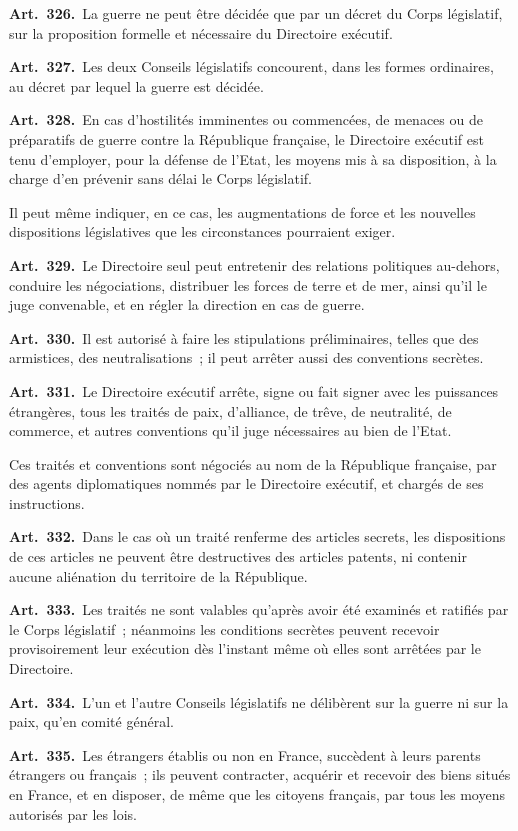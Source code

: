 \documentclass[french,twoside]{book} %
\newcommand{\labelchar}[1]{\textbf{\color{rubric} #1}}
\begin{document}
\labelchar{Art. 326.} La guerre ne peut être décidée que par un décret du Corps législatif, sur la proposition formelle et nécessaire du Directoire exécutif.\par
\labelchar{Art. 327.} Les deux Conseils législatifs concourent, dans les formes ordinaires, au décret par lequel la guerre est décidée.\par
\labelchar{Art. 328.} En cas d’hostilités imminentes ou commencées, de menaces ou de préparatifs de guerre contre la République française, le Directoire exécutif est tenu d’employer, pour la défense de l’Etat, les moyens mis à sa disposition, à la charge d’en prévenir sans délai le Corps législatif.\par
Il peut même indiquer, en ce cas, les augmentations de force et les nouvelles dispositions législatives que les circonstances pourraient exiger.\par
\labelchar{Art. 329.} Le Directoire seul peut entretenir des relations politiques au-dehors, conduire les négociations, distribuer les forces de terre et de mer, ainsi qu’il le juge convenable, et en régler la direction en cas de guerre.\par
\labelchar{Art. 330.} Il est autorisé à faire les stipulations préliminaires, telles que des armistices, des neutralisations ; il peut arrêter aussi des conventions secrètes.\par
\labelchar{Art. 331.} Le Directoire exécutif arrête, signe ou fait signer avec les puissances étrangères, tous les traités de paix, d’alliance, de trêve, de neutralité, de commerce, et autres conventions qu’il juge nécessaires au bien de l’Etat.\par
Ces traités et conventions sont négociés au nom de la République française, par des agents diplomatiques nommés par le Directoire exécutif, et chargés de ses instructions.\par
\labelchar{Art. 332.} Dans le cas où un traité renferme des articles secrets, les dispositions de ces articles ne peuvent être destructives des articles patents, ni contenir aucune aliénation du territoire de la République.\par
\labelchar{Art. 333.} Les traités ne sont valables qu’après avoir été examinés et ratifiés par le Corps législatif ; néanmoins les conditions secrètes peuvent recevoir provisoirement leur exécution dès l’instant même où elles sont arrêtées par le Directoire.\par
\labelchar{Art. 334.} L’un et l’autre Conseils législatifs ne délibèrent sur la guerre ni sur la paix, qu’en comité général.\par
\labelchar{Art. 335.} Les étrangers établis ou non en France, succèdent à leurs parents étrangers ou français ; ils peuvent contracter, acquérir et recevoir des biens situés en France, et en disposer, de même que les citoyens français, par tous les moyens autorisés par les lois.
\end{document}
